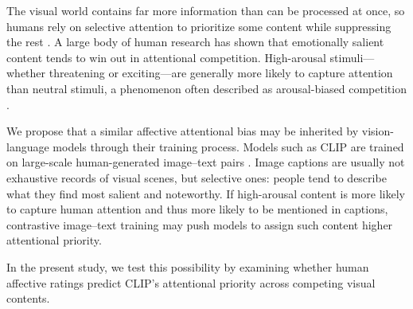 \documentclass{article}
\begin{document}
The visual world contains far more information than can be processed at once, so humans rely on selective attention to prioritize some content while suppressing the rest \citep{tresilianSelectiveAttentionReaching1999,serencesSelectiveVisualAttention2006,desimoneNeuralMechanismsSelective1995}. A large body of human research has shown that emotionally salient content tends to win out in attentional competition. High-arousal stimuli---whether threatening or exciting---are generally more likely to capture attention than neutral stimuli, a phenomenon often described as arousal-biased competition \citep{hansenFindingFaceCrowd1988a,ohmanEmotionDrivesAttention2001,vogtAllocationSpatialAttention2008b,schimmackAttentionalInterferenceEffects2005a}.

We propose that a similar affective attentional bias may be inherited by vision-language models through their training process. Models such as CLIP are trained on large-scale human-generated image--text pairs \citep{radfordLearningTransferableVisual2021a}. Image captions are usually not exhaustive records of visual scenes, but selective ones: people tend to describe what they find most salient and noteworthy. If high-arousal content is more likely to capture human attention and thus more likely to be mentioned in captions, contrastive image--text training may push models to assign such content higher attentional priority. 

In the present study, we test this possibility by examining whether human affective ratings predict CLIP’s attentional priority across competing visual contents.


\end{document}
